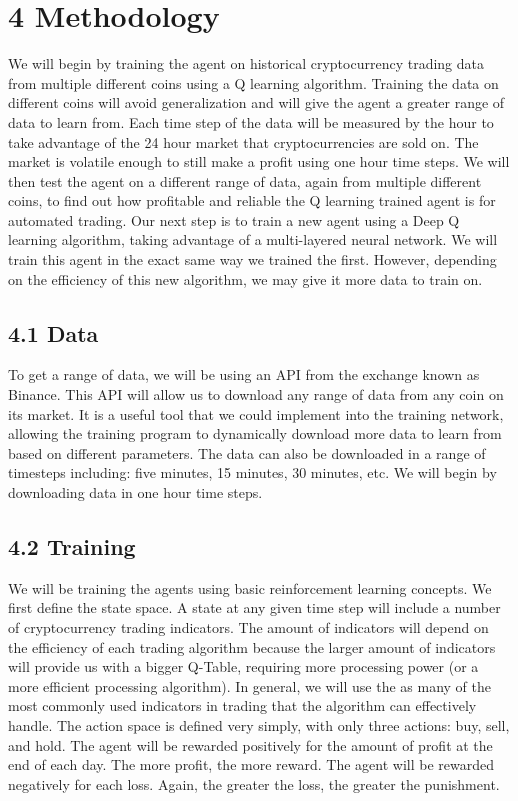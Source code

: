 \documentclass[letterpaper]{article}
\begin{document}
\section{4 Methodology}
We will begin by training the agent on historical cryptocurrency trading data from multiple different coins using a Q learning algorithm. Training the data on different coins will avoid generalization and will give the agent a greater range of data to learn from. Each time step of the data will be measured by the hour to take advantage of the 24 hour market that cryptocurrencies are sold on. The market is volatile enough to still make a profit using one hour time steps. We will then test the agent on a different range of data, again from multiple different coins, to find out how profitable and reliable the Q learning trained agent is for automated trading. Our next step is to train a new agent using a Deep Q learning algorithm, taking advantage of a multi-layered neural network. We will train this agent in the exact same way we trained the first. However, depending on the efficiency of this new algorithm, we may give it more data to train on.

\subsection{4.1 Data}
To get a range of data, we will be using an API from the exchange known as Binance. This API will allow us to download any range of data from any coin on its market. It is a useful tool that we could implement into the training network, allowing the training program to dynamically download more data to learn from based on different parameters. The data can also be downloaded in a range of timesteps including: five minutes, 15 minutes, 30 minutes, etc. We will begin by downloading data in one hour time steps.

\subsection{4.2 Training}
We will be training the agents using basic reinforcement learning concepts. We first define the state space. A state at any given time step will include a number of cryptocurrency trading indicators. The amount of indicators will depend on the efficiency of each trading algorithm because the larger amount of indicators will provide us with a bigger Q-Table, requiring more processing power (or a more efficient processing algorithm). In general, we will use the as many of the most commonly used indicators in trading that the algorithm can effectively handle. The action space is defined very simply, with only three actions: buy, sell, and hold. The agent will be rewarded positively for the amount of profit at the end of each day. The more profit, the more reward. The agent will be rewarded negatively for each loss. Again, the greater the loss, the greater the punishment.
\end{document}
